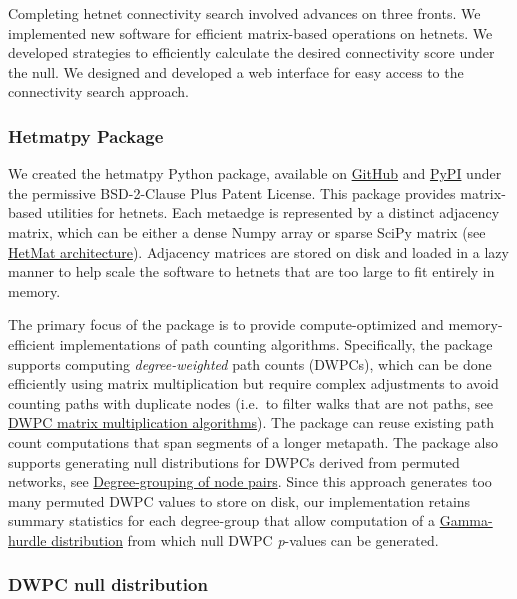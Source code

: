 Completing hetnet connectivity search involved advances on three fronts.
We implemented new software for efficient matrix-based operations on hetnets.
We developed strategies to efficiently calculate the desired connectivity score under the null.
We designed and developed a web interface for easy access to the connectivity search approach.

\hypertarget{hetmatpy-package}{%
\subsubsection{Hetmatpy Package}\label{hetmatpy-package}}

We created the hetmatpy Python package,
available on \href{https://github.com/hetio/hetmatpy}{GitHub} and \href{https://pypi.org/project/hetmatpy/}{PyPI} under the permissive BSD-2-Clause Plus Patent License.
This package provides matrix-based utilities for hetnets.
Each metaedge is represented by a distinct adjacency matrix,
which can be either a dense Numpy array or sparse SciPy matrix (see \protect\hyperlink{hetmat-architecture}{HetMat architecture}).
Adjacency matrices are stored on disk and loaded in a lazy manner to help scale the software to hetnets that are too large to fit entirely in memory.

The primary focus of the package is to provide compute-optimized and memory-efficient implementations of path counting algorithms.
Specifically, the package supports computing \emph{degree-weighted} path counts (DWPCs),
which can be done efficiently using matrix multiplication
but require complex adjustments to avoid counting paths with duplicate nodes
(i.e.~to filter walks that are not paths, see \protect\hyperlink{dwpc-matrix-multiplication-algorithms}{DWPC matrix multiplication algorithms}).
The package can reuse existing path count computations that span segments of a longer metapath.
The package also supports generating null distributions for DWPCs derived from permuted networks,
see \protect\hyperlink{degree-grouping-of-node-pairs}{Degree-grouping of node pairs}.
Since this approach generates too many permuted DWPC values to store on disk,
our implementation retains summary statistics for each degree-group that allow computation of a \protect\hyperlink{gamma-hurdle-distribution}{Gamma-hurdle distribution} from which null DWPC \emph{p}-values can be generated.

\hypertarget{dwpc-null-distribution}{%
\subsubsection{DWPC null distribution}\label{dwpc-null-distribution}}

